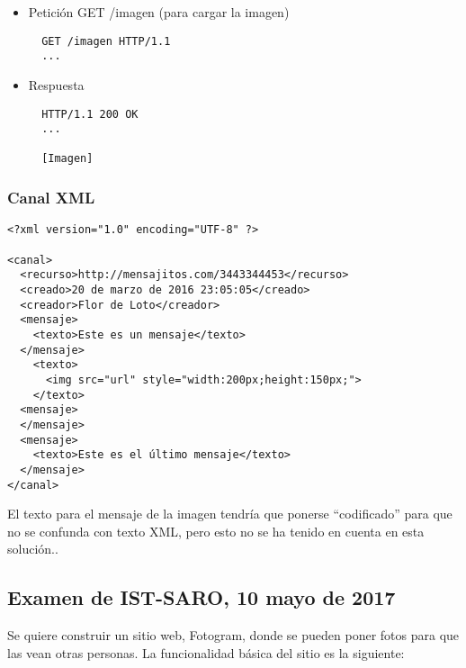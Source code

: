 \begin{itemize}
\item Petición GET /imagen (para cargar la imagen)

\begin{verbatim}
  GET /imagen HTTP/1.1
  ...
\end{verbatim}

\item Respuesta

\begin{verbatim}
  HTTP/1.1 200 OK
  ...

  [Imagen]
\end{verbatim}

\end{itemize}



\subsubsection*{Canal XML}


\begin{verbatim}
<?xml version="1.0" encoding="UTF-8" ?>

<canal>
  <recurso>http://mensajitos.com/3443344453</recurso>
  <creado>20 de marzo de 2016 23:05:05</creado>
  <creador>Flor de Loto</creador>
  <mensaje>
    <texto>Este es un mensaje</texto>
  </mensaje>
    <texto>
      <img src="url" style="width:200px;height:150px;">
    </texto>
  <mensaje>
  </mensaje>
  <mensaje>
    <texto>Este es el último mensaje</texto>
  </mensaje>
</canal>
\end{verbatim}

El texto para el mensaje de la imagen tendría que ponerse ``codificado'' para que no se confunda con texto XML, pero esto no se ha tenido en cuenta en esta solución..



\subsection{Examen de IST-SARO, 10 mayo de 2017}

Se quiere construir un sitio web, Fotogram, donde se pueden poner fotos para que las vean otras personas. La funcionalidad básica del sitio es la siguiente:

